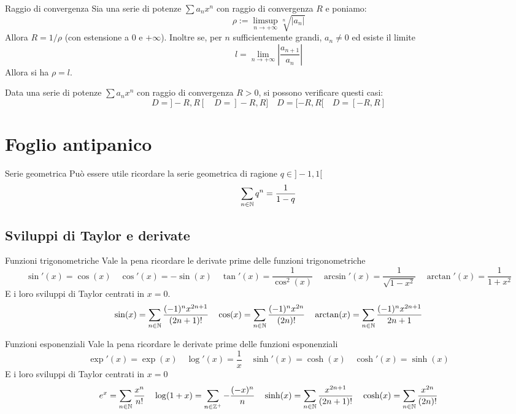 \documentclass{article}
\begin{document}
\begin{theorem}{Raggio di convergenza}{}
    Sia una serie di potenze $\sum a_nx^n$ con raggio di convergenza $R$ e poniamo:
    \[\rho := \limsup_{n\to+\infty} \sqrt[n]{|a_n|}\] 
    Allora $R= 1/\rho$ (con estensione a $0$ e $+\infty$). Inoltre se, per $n$ sufficientemente grandi, $a_n \neq 0$ ed esiste il limite
    \[l = \lim_{n\to+\infty}\left|\frac{a_{n+1}}{a_n}\right|\]
    Allora si ha $\rho = l$.
\end{theorem}

\begin{remark}{}{}
    Data una serie di potenze $\sum a_nx^n$ con raggio di convergenza $R>0$, si possono verificare questi casi:
    \[D = ]-R,R[ \quad D = ]-R,R] \quad D = [-R,R[ \quad D = [-R,R]\]
\end{remark}

\section{Foglio antipanico}

\begin{example}{Serie geometrica}{}
    Può essere utile ricordare la serie geometrica di ragione $q \in ]-1,1[$
    \[\sum_{n \in \mathbb{N}} q^n = \frac{1}{1-q}\]
\end{example}

\subsection{Sviluppi di Taylor e derivate}

\begin{example}{Funzioni trigonometriche}{}
    Vale la pena ricordare le derivate prime delle funzioni trigonometriche
    \[\sin'(x) = \cos(x) \quad \cos'(x) = -\sin(x) \quad \tan'(x) = \frac{1}{\cos^2(x)} \quad \arcsin'(x) = \frac{1}{\sqrt{1-x^2}} \quad \arctan'(x) = \frac{1}{1+x^2}\] 
    E i loro sviluppi di Taylor centrati in $x=0$.
    \[\sin(x) = \sum_{n\in\mathbb{N}} \frac{(-1)^nx^{2n+1}}{(2n+1)!} \quad \cos(x) = \sum_{n\in\mathbb{N}} \frac{(-1)^nx^{2n}}{(2n)!} \quad \arctan(x) = \sum_{n\in\mathbb{N}} \frac{(-1)^n x^{2n+1}}{2n+1}\]
\end{example}

\begin{example}{Funzioni esponenziali}{}
    Vale la pena ricordare le derivate prime delle funzioni esponenziali
    \[\exp'(x) = \exp(x) \quad \log'(x) = \frac{1}{x} \quad \sinh'(x) = \cosh(x) \quad \cosh'(x) = \sinh(x)\]
    E i loro sviluppi di Taylor centrati in $x=0$
    \[e^x = \sum_{n\in\mathbb{N}} \frac{x^n}{n!} \quad \log(1+x) = \sum_{n \in \mathbb{Z}^+} -\frac{(-x)^n}{n} \quad \sinh(x) = \sum_{n\in\mathbb{N}} \frac{x^{2n+1}}{(2n+1)!} \quad \cosh(x)= \sum_{n\in\mathbb{N}} \frac{x^{2n}}{(2n)!}\]
\end{example}
\end{document}
